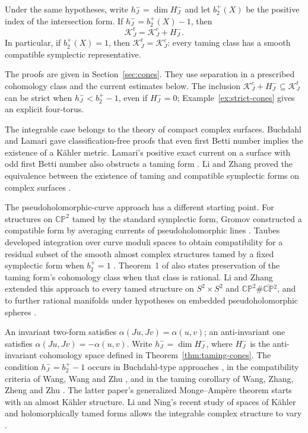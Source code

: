 \begin{corollary}\label{cor:taming-cones}
Under the same hypotheses, write \(h_J^-=\dim H_J^-\) and let
\(b_2^+(X)\) be the positive index of the intersection form.
If \(h_J^-=b_2^+(X)-1\), then
\[
 \mathcal K_J^t=\mathcal K_J^c+H_J^-.
\]
In particular, if \(b_2^+(X)=1\), then
\(\mathcal K_J^t=\mathcal K_J^c\): every taming class has a smooth
compatible symplectic representative.
\end{corollary}

The proofs are given in Section~\ref{sec:cones}. They use separation
in a prescribed cohomology class and the current estimates below.
The inclusion
\(\mathcal K_J^c+H_J^-\subseteq\mathcal K_J^t\)
can be strict when \(h_J^-<b_2^+-1\), even if \(H_J^-=0\);
Example~\ref{ex:strict-cones} gives an explicit four-torus.

The integrable case belongs to the theory of compact complex surfaces.
Buchdahl \cite[Theorem~11]{Buchdahl1999} and Lamari
\cite[Corollary~5.7]{Lamari1999} gave classification-free proofs
that even first Betti number implies the existence of a K\"ahler metric.
Lamari's positive exact current on a surface with odd first Betti number
also obstructs a taming form \cite[Theorem~6.1]{Lamari1999}.
Li and Zhang proved the equivalence between the existence of taming
and compatible symplectic forms on complex surfaces
\cite[Theorem~1.2]{LiZhang2009}.

The pseudoholomorphic-curve approach has a different starting point.
For structures on \(\mathbb{CP}^2\) tamed by the standard symplectic
form, Gromov constructed a compatible form by averaging currents
of pseudoholomorphic lines \cite[Section~2.4.A$'$]{Gromov1985}.
Taubes developed integration over curve moduli spaces to obtain
compatibility for a residual subset of the smooth almost complex
structures tamed by a fixed symplectic form when \(b_2^+=1\)
\cite{Taubes2011,Taubes2017}.
Theorem~1 of \cite{Taubes2011} also states preservation of the taming
form's cohomology class when that class is rational.
Li and Zhang extended this approach to every tamed structure on
\(S^2\times S^2\) and
\(\mathbb{CP}^2\#\overline{\mathbb{CP}}{}^2\), and to further
rational manifolds under hypotheses on embedded pseudoholomorphic
spheres \cite[Theorems~1.2 and~1.3]{LiZhang2015}.

An invariant two-form satisfies
\(\alpha(Ju,Jv)=\alpha(u,v)\); an anti-invariant one satisfies
\(\alpha(Ju,Jv)=-\alpha(u,v)\).
Write \(h_J^-=\dim H_J^-\), where \(H_J^-\) is the anti-invariant
cohomology space defined in Theorem~\ref{thm:taming-cones}.
The condition \(h_J^-=b_2^+-1\) occurs in Buchdahl-type approaches
\cite{TWZZ2022,LinZhou2025}, in the compatibility criteria of
Wang, Wang and Zhu \cite[Theorems~4.3 and~5.1]{WangWangZhu2023},
and in the taming corollary of Wang, Zhang, Zheng and Zhu
\cite[Corollary~1.3]{WangZhangZhengZhu2025}.
The latter paper's generalized Monge--Amp\`ere theorem starts with
an almost K\"ahler structure.
Li and Ning's recent study of spaces of K\"ahler and holomorphically
tamed forms allows the integrable complex structure to vary
\cite{LiNing2026}.

